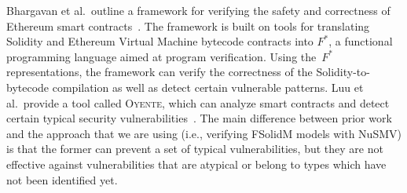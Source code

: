 Bhargavan et al.\ outline a framework for verifying the safety and correctness of Ethereum smart contracts~\cite{bhargavan2016short}.
The framework is built on tools for translating Solidity and Ethereum Virtual Machine bytecode contracts into $F^*$, a functional programming language aimed
at program verification.
Using the~$F^*$ representations, the framework can verify the correctness of the Solidity-to-bytecode compilation as well as detect certain vulnerable patterns. Luu et al.\ provide a tool called \textsc{Oyente}, which can analyze smart contracts and detect certain typical security vulnerabilities~\cite{luu2016making}. The main difference between prior work and the approach that we are using (i.e., verifying FSolidM models with NuSMV) is that the former can prevent a set of typical vulnerabilities, but they are not effective against vulnerabilities that are atypical or belong to types which have not been identified yet.


